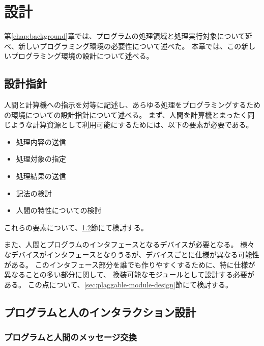 \chapter{設計}\label{chap:design}

第\ref{chap:background}章では、プログラムの処理領域と処理実行対象について延べ、新しいプログラミング環境の必要性について述べた。
本章では、この新しいプログラミング環境の設計について述べる。

\section{設計指針}\label{ux8a2dux8a08ux6307ux91dd}

人間と計算機への指示を対等に記述し、あらゆる処理をプログラミングするための環境についての設計指針について述べる。
まず、人間を計算機とまったく同じような計算資源として利用可能にするためには、以下の要素が必要である。

\begin{itemize}
\itemsep1pt\parskip0pt
\item
  処理内容の送信
\item
  処理対象の指定
\item
  処理結果の送信
\item
  記法の検討
\item
  人間の特性についての検討
\end{itemize}

これらの要素について、\ref{sec:program-human-interaction-design}節にて検討する。

また、人間とプログラムのインタフェースとなるデバイスが必要となる。
様々なデバイスがインタフェースとなりうるが、デバイスごとに仕様が異なる可能性がある。
このインタフェース部分を誰でも作りやすくするために、特に仕様が異なることの多い部分に関して、
換装可能なモジュールとして設計する必要がある。
この点について、\ref{sec:plaggable-module-design}節にて検討する。

\section{プログラムと人のインタラクション設計}\label{sec:program-human-interaction-design}

\subsection{プログラムと人間のメッセージ交換}\label{ux30d7ux30edux30b0ux30e9ux30e0ux3068ux4ebaux9593ux306eux30e1ux30c3ux30bbux30fcux30b8ux4ea4ux63db}

